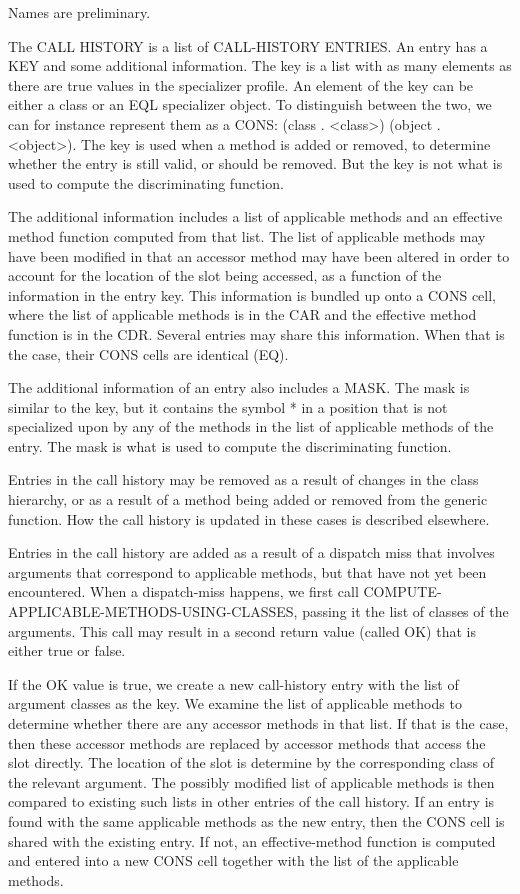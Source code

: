 Names are preliminary.

The CALL HISTORY is a list of CALL-HISTORY ENTRIES.  An entry has a
KEY and some additional information.  The key is a list with as many
elements as there are true values in the specializer profile.  An
element of the key can be either a class or an EQL specializer object.
To distinguish between the two, we can for instance represent them as
a CONS: (class . <class>) (object . <object>).  The key is used when a
method is added or removed, to determine whether the entry is still
valid, or should be removed.  But the key is not what is used to
compute the discriminating function.

The additional information includes a list of applicable methods and
an effective method function computed from that list.  The list of
applicable methods may have been modified in that an accessor method
may have been altered in order to account for the location of the slot
being accessed, as a function of the information in the entry key.
This information is bundled up onto a CONS cell, where the list of
applicable methods is in the CAR and the effective method function is
in the CDR. Several entries may share this information.  When that is
the case, their CONS cells are identical (EQ).

The additional information of an entry also includes a MASK.  The mask
is similar to the key, but it contains the symbol * in a position that
is not specialized upon by any of the methods in the list of
applicable methods of the entry.  The mask is what is used to compute
the discriminating function.

Entries in the call history may be removed as a result of changes in
the class hierarchy, or as a result of a method being added or removed
from the generic function.  How the call history is updated in these
cases is described elsewhere.

Entries in the call history are added as a result of a dispatch miss
that involves arguments that correspond to applicable methods, but
that have not yet been encountered.  When a dispatch-miss happens, we
first call COMPUTE-APPLICABLE-METHODS-USING-CLASSES, passing it the
list of classes of the arguments.  This call may result in a second
return value (called OK) that is either true or false.

If the OK value is true, we create a new call-history entry with the
list of argument classes as the key.  We examine the list of
applicable methods to determine whether there are any accessor methods
in that list.  If that is the case, then these accessor methods are
replaced by accessor methods that access the slot directly.  The
location of the slot is determine by the corresponding class of the
relevant argument.  The possibly modified list of applicable methods
is then compared to existing such lists in other entries of the call
history.  If an entry is found with the same applicable methods as the
new entry, then the CONS cell is shared with the existing entry.  If
not, an effective-method function is computed and entered into a new
CONS cell together with the list of the applicable methods.

